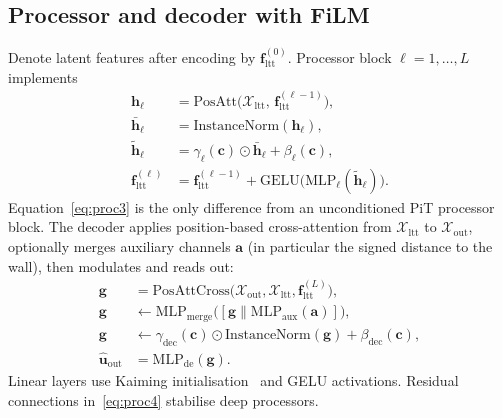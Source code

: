 \documentclass[final,3p,times]{elsarticle}
\begin{document}
\subsection{Processor and decoder with FiLM}
\label{sec:blocks}
Denote latent features after encoding by $\mathbf{f}_{\mathrm{ltt}}^{(0)}$. Processor block $\ell=1,\ldots,L$ implements
\begin{align}
  \mathbf{h}_{\ell}
  &=
  \mathrm{PosAtt}\bigl(\mathcal{X}_{\mathrm{ltt}},\,\mathbf{f}_{\mathrm{ltt}}^{(\ell-1)}\bigr),
  \label{eq:proc1}\\
  \bar{\mathbf{h}}_{\ell}
  &=
  \mathrm{InstanceNorm}(\mathbf{h}_{\ell}),
  \label{eq:proc2}\\
  \tilde{\mathbf{h}}_{\ell}
  &=
  \gamma_{\ell}(\mathbf{c})\odot\bar{\mathbf{h}}_{\ell}+\beta_{\ell}(\mathbf{c}),
  \label{eq:proc3}\\
  \mathbf{f}_{\mathrm{ltt}}^{(\ell)}
  &=
  \mathbf{f}_{\mathrm{ltt}}^{(\ell-1)}
  +
  \mathrm{GELU}\bigl(\mathrm{MLP}_{\ell}(\tilde{\mathbf{h}}_{\ell})\bigr).
  \label{eq:proc4}
\end{align}
Equation~\eqref{eq:proc3} is the only difference from an unconditioned PiT processor block. The decoder applies position-based cross-attention from $\mathcal{X}_{\mathrm{ltt}}$ to $\mathcal{X}_{\mathrm{out}}$, optionally merges auxiliary channels $\mathbf{a}$ (in particular the signed distance to the wall), then modulates and reads out:
\begin{align}
  \mathbf{g}
  &=
  \mathrm{PosAttCross}\bigl(\mathcal{X}_{\mathrm{out}},\mathcal{X}_{\mathrm{ltt}},\mathbf{f}_{\mathrm{ltt}}^{(L)}\bigr),
  \label{eq:dec1}\\
  \mathbf{g}
  &\leftarrow
  \mathrm{MLP}_{\mathrm{merge}}\bigl([\mathbf{g}\|\mathrm{MLP}_{\mathrm{aux}}(\mathbf{a})]\bigr),
  \label{eq:dec2}\\
  \mathbf{g}
  &\leftarrow
  \gamma_{\mathrm{dec}}(\mathbf{c})\odot\mathrm{InstanceNorm}(\mathbf{g})+\beta_{\mathrm{dec}}(\mathbf{c}),
  \label{eq:dec3}\\
  \hat{\mathbf{u}}_{\mathrm{out}}
  &=
  \mathrm{MLP}_{\mathrm{de}}(\mathbf{g}).
  \label{eq:dec4}
\end{align}
Linear layers use Kaiming initialisation~\cite{he2016resnet} and GELU activations. Residual connections in~\eqref{eq:proc4} stabilise deep processors.
\end{document}
